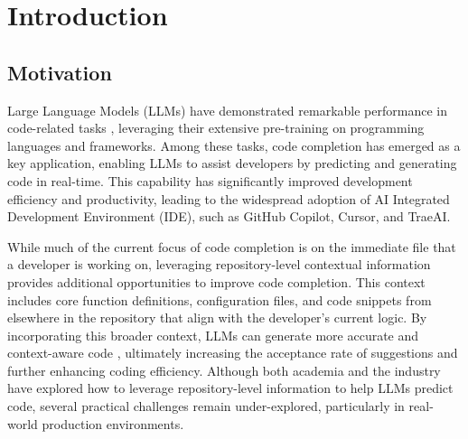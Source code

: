 \chapter{Introduction}

\section{Motivation}

Large Language Models (LLMs) have demonstrated remarkable performance in code-related tasks \cite{codeium, marscode, copilot}, leveraging their extensive pre-training on programming languages and frameworks. Among these tasks, code completion has emerged as a key application, enabling LLMs to assist developers by predicting and generating code in real-time. This capability has significantly improved development efficiency and productivity, leading to the widespread adoption of AI Integrated Development Environment (IDE), such as GitHub Copilot, Cursor, and TraeAI.

While much of the current focus of code completion is on the immediate file that a developer is working on, leveraging repository-level contextual information provides additional opportunities to improve code completion. This context includes  core function definitions, configuration files, and code snippets from elsewhere in the repository that align with the developer’s current logic. By incorporating this broader context, LLMs can generate more accurate and context-aware code \cite{banerjee2024contextmatterspushingboundaries}, ultimately increasing the acceptance rate of suggestions and further enhancing coding efficiency. Although both academia and the industry have explored how to leverage repository-level information to help LLMs predict code, several practical challenges remain under-explored, particularly in real-world production environments.


